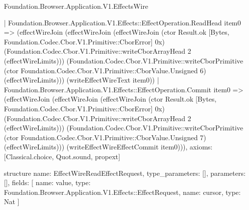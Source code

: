 \begin{lexlean}{Foundation.Browser.Application.V1.EffectsWire}
\begin{semanticmodule}
{    | Foundation.Browser.Application.V1.Effects::EffectOperation.ReadHead item0 => (effectWireJoin (effectWireJoin (effectWireJoin (ctor Result.ok [Bytes, Foundation.Codec.Cbor.V1.Primitive::CborError] 0x) (Foundation.Codec.Cbor.V1.Primitive::writeCborArrayHead 2 (effectWireLimits))) (Foundation.Codec.Cbor.V1.Primitive::writeCborPrimitive (ctor Foundation.Codec.Cbor.V1.Primitive::CborValue.Unsigned 6) (effectWireLimits))) (writeEffectWireText item0))
    | Foundation.Browser.Application.V1.Effects::EffectOperation.Commit item0 => (effectWireJoin (effectWireJoin (effectWireJoin (ctor Result.ok [Bytes, Foundation.Codec.Cbor.V1.Primitive::CborError] 0x) (Foundation.Codec.Cbor.V1.Primitive::writeCborArrayHead 2 (effectWireLimits))) (Foundation.Codec.Cbor.V1.Primitive::writeCborPrimitive (ctor Foundation.Codec.Cbor.V1.Primitive::CborValue.Unsigned 7) (effectWireLimits))) (writeEffectWireEffectCommit item0))),
  axioms: [Classical.choice, Quot.sound, propext]
}

structure{
  name: EffectWireReadEffectRequest,
  type_parameters: [],
  parameters: [],
  fields: [
    {name: value, type: Foundation.Browser.Application.V1.Effects::EffectRequest},
    {name: cursor, type: Nat}
  ]
}


\end{semanticmodule}
\end{lexlean}
